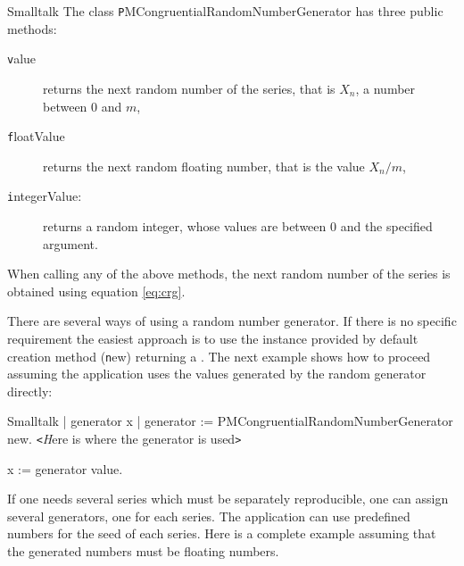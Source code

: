 \begin{displaycode}{Smalltalk}
\noindent The class {\texttt PMCongruentialRandomNumberGenerator} has
three public methods:
\begin{description}
  \item[\texttt value] returns the next random number of the series,
  that is $X_n$, a number between $0$ and $m$,
  \item[\texttt floatValue] returns the next random floating number,
  that is the value $X_n / m$,
  \item[\texttt integerValue:] returns a random integer, whose values
  are between 0 and the specified argument.
\end{description}
When calling any of the above methods, the next random number of
the series is obtained using equation \ref{eq:crg}.

There are several ways of using a random number generator. If
there is no specific requirement the easiest approach is to use
the instance provided by default creation method ({\texttt new})
returning a . The next example shows how to
proceed assuming the application uses the values generated by the
random generator directly:
\begin{displaycode}{Smalltalk}
 | generator x |
 generator := PMCongruentialRandomNumberGenerator new.
\hfil{\texttt <\textsl Here is where the generator is used\texttt
>}\hfil

 x := generator value.
\end{displaycode}

If one needs several series which must be separately reproducible,
one can assign several generators, one for each series. The
application can use predefined numbers for the seed of each
series. Here is a complete example assuming that the generated
numbers must be floating numbers.


\end{displaycode}
